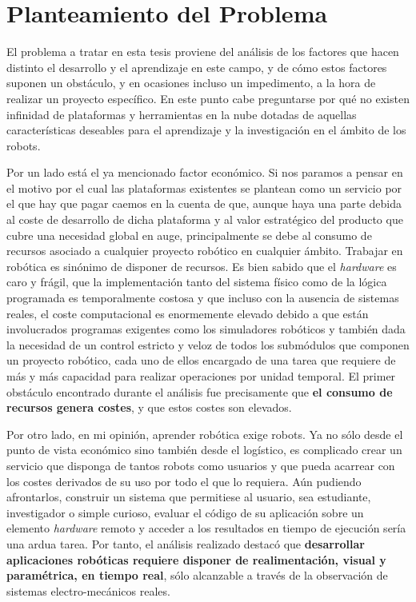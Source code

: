 \section{Planteamiento del Problema}

El problema a tratar en esta tesis proviene del análisis de los factores que hacen distinto el desarrollo y el aprendizaje en este campo, y de cómo estos factores suponen un obstáculo, y en ocasiones incluso un impedimento, a la hora de realizar un proyecto específico. En este punto cabe preguntarse por qué no existen infinidad de plataformas y herramientas en la nube dotadas de aquellas características deseables para el aprendizaje y la investigación en el ámbito de los robots. 

Por un lado está el ya mencionado factor económico. Si nos paramos a pensar en el motivo por el cual las plataformas existentes se plantean como un servicio por el que hay que pagar caemos en la cuenta de que, aunque haya una parte debida al coste de desarrollo de dicha plataforma y al valor estratégico del producto que cubre una necesidad global en auge, principalmente se debe al consumo de recursos asociado a cualquier proyecto robótico en cualquier ámbito. Trabajar en robótica es sinónimo de disponer de recursos. Es bien sabido que el \textit{hardware} es caro y frágil, que la implementación tanto del sistema físico como de la lógica programada es temporalmente costosa y que incluso con la ausencia de sistemas reales, el coste computacional es enormemente elevado debido a que están involucrados programas exigentes como los simuladores robóticos y también dada la necesidad de un control estricto y veloz de todos los submódulos que componen un proyecto robótico, cada uno de ellos encargado de una tarea que requiere de más y más capacidad para realizar operaciones por unidad temporal. El primer obstáculo encontrado durante el análisis fue precisamente que \textbf{el consumo de recursos genera costes}, y que estos costes son elevados.

Por otro lado, en mi opinión, aprender robótica exige robots. Ya no sólo desde el punto de vista económico sino también desde el logístico, es complicado crear un servicio que disponga de tantos robots como usuarios y que pueda acarrear con los costes derivados de su uso por todo el que lo requiera. Aún pudiendo afrontarlos, construir un sistema que permitiese al usuario, sea estudiante, investigador o simple curioso, evaluar el código de su aplicación sobre un elemento \textit{hardware} remoto y acceder a los resultados en tiempo de ejecución sería una ardua tarea. Por tanto, el análisis realizado destacó que \textbf{desarrollar aplicaciones robóticas requiere disponer de realimentación, visual y paramétrica, en tiempo real}, sólo alcanzable a través de la observación de sistemas electro-mecánicos reales.

